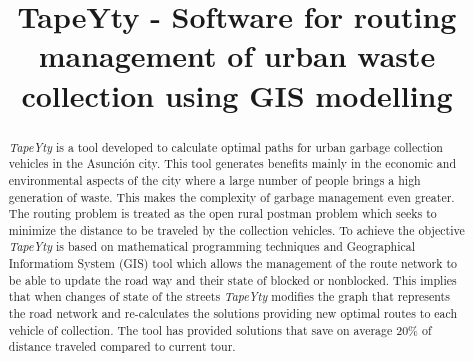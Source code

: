 \documentclass[spanish, conference]{IEEEtran}
\begin{document}
\title{TapeYty - Software for routing management of urban waste collection using GIS modelling\\
}

\author{
}

\maketitle

\begin{abstract}
\textit{TapeYty} is a tool developed to calculate optimal paths for urban garbage collection vehicles in the Asunción city. This tool generates benefits mainly in the economic and environmental aspects of the city where a large number of people brings a high generation of waste. This makes the complexity of garbage management even greater. The routing problem is treated as the open rural postman problem which seeks to minimize the distance to be traveled by the collection vehicles. To achieve the objective \textit{TapeYty} is based on mathematical programming techniques and Geographical Informatiom System (GIS) tool which allows the management of the route network to be able to update the road way and their state of blocked or nonblocked. This implies that when changes of state of the streets \textit{TapeYty} modifies the graph that represents the road network and re-calculates the solutions providing new optimal routes to each vehicle of collection. The tool has provided solutions that save on average 20\% of distance traveled compared to current tour.
\end{abstract}
\end{document}
